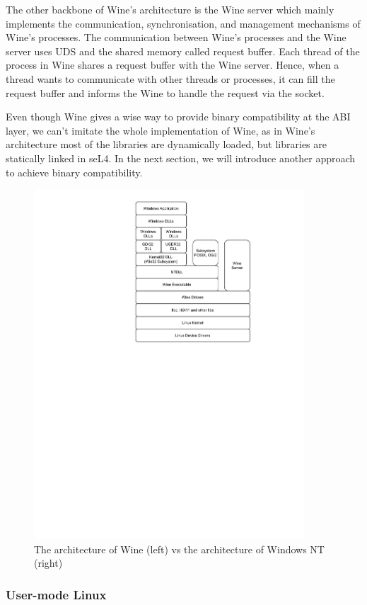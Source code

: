 The other backbone of Wine's architecture is the Wine server which mainly implements the communication, synchronisation, and management mechanisms of Wine's processes. The communication between Wine's processes and the Wine server uses UDS and the shared memory called request buffer. Each thread of the process in Wine shares a request buffer with the Wine server. Hence, when a thread wants to communicate with other threads or processes, it can fill the request buffer and informs the Wine to handle the request via the socket.

Even though Wine gives a wise way to provide binary compatibility at the ABI layer, we can't imitate the whole implementation of Wine, as in Wine's architecture most of the libraries are dynamically loaded, but libraries are statically linked in seL4. In the next section, we will introduce another approach to achieve binary compatibility.  

\begin{figure}[h]
    \centering
    \includegraphics[clip, trim=0.5cm 16cm 3cm 0.5cm, width=0.9\textwidth, height=0.8\textwidth]{ch2/Wine-arch.pdf}
    \caption{The architecture of Wine (left) vs the architecture of Windows NT (right)}
    \label{fig:wine}
\end{figure}

\subsubsection{User-mode Linux}


